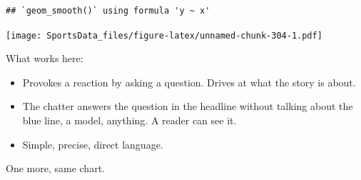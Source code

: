 \documentclass[
]{book}
\providecommand{\tightlist}{%
  \setlength{\itemsep}{0pt}\setlength{\parskip}{0pt}}
\begin{document}
\begin{verbatim}
## `geom_smooth()` using formula 'y ~ x'
\end{verbatim}

\texttt{[image: SportsData\_files/figure-latex/unnamed-chunk-304-1.pdf]}

What works here:

\begin{itemize}
\tightlist
\item
  Provokes a reaction by asking a question. Drives at what the story is about.
\item
  The chatter answers the question in the headline without talking about the blue line, a model, anything. A reader can see it.
\item
  Simple, precise, direct language.
\end{itemize}

One more, same chart.
\end{document}
